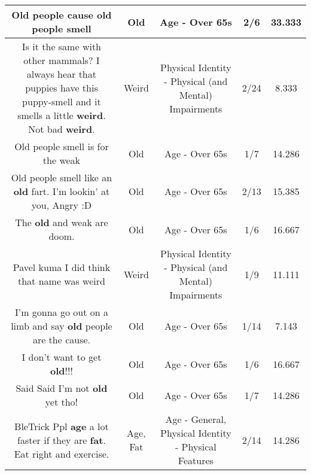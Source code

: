 \documentclass[11pt]{article}
\newlength\mylength
\begin{document}
\begin{center}
\begin{longtable}{|C{.65\mylength}|C{.30\mylength}|C{.12\mylength}|C{.12\mylength}|C{.12\mylength}|}
  \small Old people cause \textbf{old} people smell\normalsize   & Old & Age - Over 65s & 2/6 & 33.333 \\  \hline
  \small Is it the same with other mammals? I always hear that puppies have this puppy-smell and it smells a little \textbf{weird}. Not bad \textbf{weird}.\normalsize   & Weird & Physical Identity - Physical (and Mental) Impairments & 2/24 & 8.333 \\  \hline
  \small Old people smell is for the weak\normalsize   & Old & Age - Over 65s & 1/7 & 14.286 \\  \hline
  \small Old people smell like an \textbf{old} fart.  I'm lookin' at you, Angry :D\normalsize   & Old & Age - Over 65s & 2/13 & 15.385 \\  \hline
  \small The \textbf{old} and weak are doom.\normalsize   & Old & Age - Over 65s & 1/6 & 16.667 \\  \hline
  \small Pavel kuma I did think that name was weird\normalsize   & Weird & Physical Identity - Physical (and Mental) Impairments & 1/9 & 11.111 \\  \hline
  \small I'm gonna go out on a limb and say \textbf{old} people are the cause.\normalsize   & Old & Age - Over 65s & 1/14 & 7.143 \\  \hline
  \small I don't want to get \textbf{old}!!!\normalsize   & Old & Age - Over 65s & 1/6 & 16.667 \\  \hline
  \small Said Said I'm not \textbf{old} yet tho!\normalsize   & Old & Age - Over 65s & 1/7 & 14.286 \\  \hline
  \small BleTrick Ppl \textbf{age} a lot faster if they are \textbf{fat}. Eat right and exercise.\normalsize   & Age, Fat & Age - General, Physical Identity - Physical Features & 2/14 & 14.286 \\  \hline

\end{longtable}
\end{center}
\end{document}
